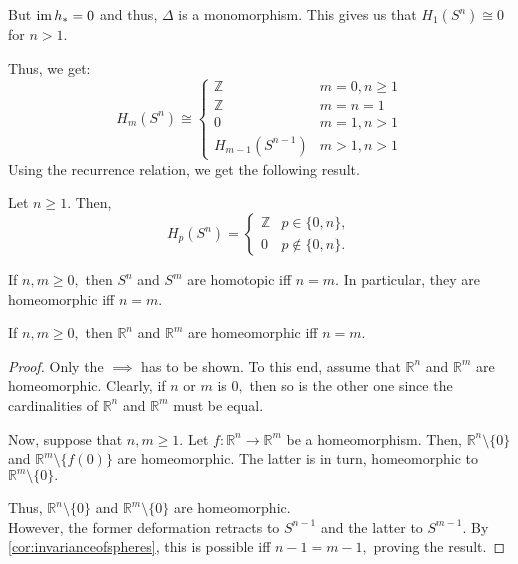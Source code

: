 \documentclass[12pt]{article}
\begin{document}
\begin{ex}
	But $\operatorname{im} h_* = 0$ and thus, $\Delta$ is a monomorphism. This gives us that $H_1(S^n)\cong 0$ for $n > 1.$

	Thus, we get:
	\begin{equation*} 
		H_m(S^n) \cong \begin{cases}
			\mathbb{Z} & m = 0, n \ge 1\\
			\mathbb{Z} & m = n = 1\\
			0 & m = 1, n > 1 \\
			H_{m-1}(S^{n-1}) & m > 1, n > 1
		\end{cases}
	\end{equation*}
	Using the recurrence relation, we get the following result.
\end{ex}

\begin{thm} \label{thm:homologyofspheres}
	Let $n \ge 1.$ Then,
	\begin{equation*} 
		H_p(S^n) = \begin{cases}
			\mathbb{Z} & p \in \{0, n\},\\
			0 & p \notin \{0, n\}.	
		\end{cases}
	\end{equation*}	
\end{thm}

\begin{cor} \label{cor:invarianceofspheres}
	If $n, m \ge 0,$ then $S^n$ and $S^m$ are homotopic iff $n = m.$ In particular, they are homeomorphic iff $n = m.$
\end{cor}

\begin{cor}
	If $n, m \ge 0,$ then $\mathbb{R}^n$ and $\mathbb{R}^m$ are homeomorphic iff $n = m.$
\end{cor}
\begin{proof} 
	Only the $\implies$ has to be shown. To this end, assume that $\mathbb{R}^n$ and $\mathbb{R}^m$ are homeomorphic. Clearly, if $n$ or $m$ is $0,$ then so is the other one since the cardinalities of $\mathbb{R}^n$ and $\mathbb{R}^m$ must be equal.

	Now, suppose that $n, m \ge 1.$ Let $f:\mathbb{R}^n \to \mathbb{R}^m$ be a homeomorphism. Then, $\mathbb{R}^n\setminus\{0\}$ and $\mathbb{R}^m\setminus\{f(0)\}$ are homeomorphic. The latter is in turn, homeomorphic to $\mathbb{R}^m\setminus\{0\}.$ 

	Thus, $\mathbb{R}^n\setminus\{0\}$ and $\mathbb{R}^m\setminus\{0\}$ are homeomorphic.\\
	However, the former deformation retracts to $S^{n-1}$ and the latter to $S^{m-1}.$ By \cref{cor:invarianceofspheres}, this is possible iff $n - 1 = m - 1,$ proving the result.
\end{proof}
\end{document}
